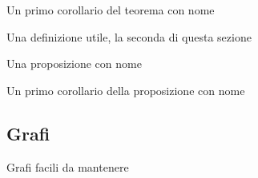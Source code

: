 \begin{corollario}
    Un primo corollario del teorema con nome
\end{corollario}

\begin{definition}
    Una definizione utile, la seconda di questa sezione
\end{definition}

\begin{proposizione}
    Una proposizione con nome
\end{proposizione}

\begin{corollario}
    Un primo corollario della proposizione con nome
\end{corollario}

\subsection{Grafi}

Grafi facili da mantenere


